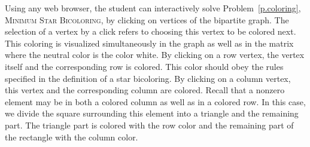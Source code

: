 \documentclass[12pt, twoside,a4paper,toc=bibliography]{scrbook}
\newcommand{\MinStaBic}{\textsc{Minimum Star Bicoloring}}
\begin{document}
Using any web browser, the student can interactively solve Problem~\ref{p.coloring}, \MinStaBic,
by clicking on
vertices of the bipartite graph. The selection of a vertex by a click refers to choosing
this vertex to be colored next. This coloring is visualized simultaneously in the graph
as well as in the matrix where the neutral color is the color white. By clicking on a row
vertex, the vertex itself and the corresponding row is colored. This color should obey
the rules specified in the definition of a star bicoloring. By clicking on a column
vertex, this vertex and the corresponding column are colored. Recall that a nonzero
element may be in both a colored column as well as in a colored row. In this case, we
divide the square surrounding this element into a triangle and the remaining part. The
triangle part is colored with the row color and the remaining part of the rectangle with
the column color.
\end{document}
